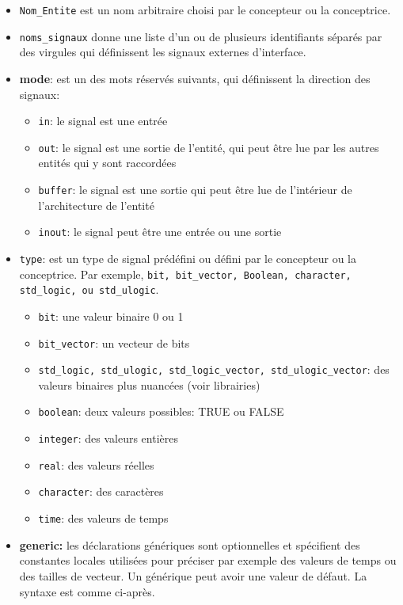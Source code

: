 \documentclass[letter, oneside]{book}
\begin{document}
\begin{itemize}
\item \texttt{Nom\_Entite} est un nom arbitraire choisi par le concepteur ou la
conceptrice.

\item \texttt{noms\_signaux} donne une liste d'un ou de plusieurs identifiants
séparés par des virgules qui définissent les signaux externes
d'interface.

\item \textbf{mode}: est un des mots réservés suivants, qui définissent la
direction des signaux:

\begin{itemize}
\item \texttt{in}: le signal est une entrée

\item \texttt{out}: le signal est une sortie de l'entité, qui peut être lue
par les autres entités qui y sont raccordées

\item \texttt{buffer}: le signal est une sortie qui peut être lue de
l'intérieur de l'architecture de l'entité

\item \texttt{inout}: le signal peut être une entrée ou une sortie
\end{itemize}

\item \texttt{type}: est un type de signal prédéfini ou défini par le concepteur
ou la conceptrice. Par exemple, \texttt{bit, bit\_vector, Boolean,
   character, std\_logic, ou std\_ulogic}.

\begin{itemize}
\item \texttt{bit}: une valeur binaire  0 ou 1

\item \texttt{bit\_vector}: un vecteur de bits

\item \texttt{std\_logic, std\_ulogic, std\_logic\_vector, std\_ulogic\_vector}: des
valeurs binaires plus nuancées (voir librairies)

\item \texttt{boolean}: deux valeurs possibles: TRUE ou FALSE

\item \texttt{integer}: des valeurs entières

\item \texttt{real}: des valeurs réelles

\item \texttt{character}: des caractères

\item \texttt{time}: des valeurs de temps
\end{itemize}

\item \textbf{generic:} les déclarations génériques sont optionnelles et
spécifient des constantes locales utilisées pour préciser par
exemple des valeurs de temps ou des tailles de vecteur. Un
générique peut avoir une valeur de défaut. La syntaxe est comme
ci-après.
\end{itemize}
\end{document}
